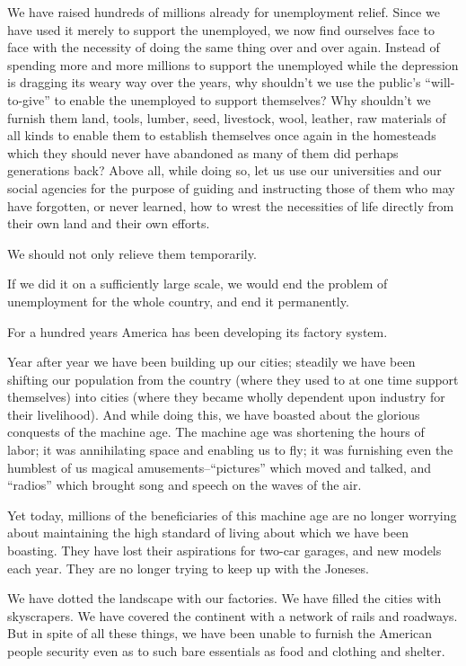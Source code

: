 \documentclass{book}
\begin{document}
We have raised hundreds of millions already for unemployment relief. Since we have used it merely to support the unemployed, we now find ourselves face to face with the necessity of doing the same thing over and over again. Instead of spending more and more millions to support the unemployed while the depression is dragging its weary way over the years, why shouldn’t we use the public’s “will-to-give” to enable the unemployed to support themselves? Why shouldn’t we furnish them land, tools, lumber, seed, livestock, wool, leather, raw materials of all kinds to enable them to establish themselves once again in the homesteads which they should never have abandoned as many of them did perhaps generations back? Above all, while doing so, let us use our universities and our social agencies for the purpose of guiding and instructing those of them who may have forgotten, or never learned, how to wrest the necessities of life directly from their own land and their own efforts.

We should not only relieve them temporarily.

If we did it on a sufficiently large scale, we would end the problem of unemployment for the whole country, and end it permanently.

For a hundred years America has been developing its factory system.

Year after year we have been building up our cities; steadily we have been shifting our population from the country (where they used to at one time support themselves) into cities (where they became wholly dependent upon industry for their livelihood). And while doing this, we have boasted about the glorious conquests of the machine age. The machine age was shortening the hours of labor; it was annihilating space and enabling us to fly; it was furnishing even the humblest of us magical amusements–“pictures” which moved and talked, and “radios” which brought song and speech on the waves of the air.

Yet today, millions of the beneficiaries of this machine age are no longer worrying about maintaining the high standard of living about which we have been boasting. They have lost their aspirations for two-car garages, and new models each year. They are no longer trying to keep up with the Joneses.

We have dotted the landscape with our factories. We have filled the cities with skyscrapers. We have covered the continent with a network of rails and roadways. But in spite of all these things, we have been unable to furnish the American people security even as to such bare essentials as food and clothing and shelter.
\end{document}
